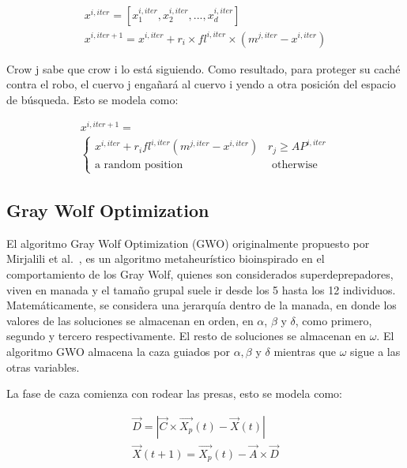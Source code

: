\documentclass[conference]{IEEEtran}
\begin{document}
\begin{equation}
	\begin{gathered}
		x^{i,iter} = [x_{1}^{i,iter}, x_{2}^{i,iter},...,x_{d}^{i,iter}]\\
		x^{i,iter+1}=x^{i,iter}+r_{i} \times fl^{i,iter} \times (m^{j,iter}-x^{i,iter})
	\end{gathered}
	\label{eq23}
\end{equation}

\noindent Crow j sabe que crow i lo está siguiendo. Como resultado, para proteger su caché contra el robo, el cuervo j engañará al cuervo i yendo a otra posición del espacio de búsqueda. Esto se modela como:

\begin{equation}
	\begin{gathered}
		x^{i,iter+1}=\\
		\begin{cases}
			x^{i,iter}+r_{i} fl^{i,iter} (m^{j,iter} - x^{i,iter}) \; \; \; r_j \geq AP^{i,iter}                                     \\
			\text{a random position} \; \; \; \; \; \;\; \; \;\; \; \;\;\; \; \;\;\; \; \; \; \;\;\; \; \;\; \; \;  \text{otherwise} 
		\end{cases}
	\end{gathered}
	\label{eq24}
\end{equation}


\subsection{Gray Wolf Optimization}

\noindent El algoritmo Gray Wolf Optimization (GWO) originalmente propuesto por Mirjalili et al.~\cite{Mirjalili2014}, es un algoritmo metaheurístico bioinspirado en el comportamiento de los Gray Wolf, quienes son considerados superdeprepadores, viven en manada y el tamaño grupal suele ir desde los 5 hasta los 12 individuos. Matemáticamente, se considera una jerarquía dentro de la manada, en donde los valores de las soluciones se almacenan en orden, en $\alpha$, $\beta$ y $\delta$, como primero, segundo y tercero respectivamente. El resto de soluciones se almacenan en $\omega$. El algoritmo GWO almacena la caza guiados por $\alpha,\beta$ y $\delta$ mientras que $\omega$ sigue a las otras variables.

\noindent La fase de caza comienza con rodear las presas, esto se modela como:

\begin{equation}
	\begin{gathered}
		\vec{D} = |\vec{C} \times \vec{X_p}(t)-\vec{X}(t)|\\
		\vec{X}(t+1) = \vec{X_p}(t) - \vec{A} \times \vec{D}
	\end{gathered}
	\label{eq25}
\end{equation}
\end{document}
